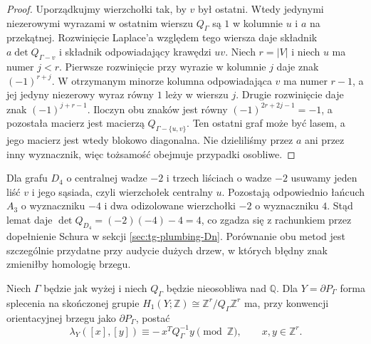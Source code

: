 \begin{proof}
Uporządkujmy wierzchołki tak, by $v$ był ostatni.
Wtedy jedynymi niezerowymi wyrazami
w ostatnim wierszu $Q_\Gamma$ są
$1$ w kolumnie $u$ i $a$ na przekątnej.
Rozwinięcie Laplace'a względem tego wiersza
daje składnik $a\det Q_{\Gamma-v}$ i składnik
odpowiadający krawędzi $uv$.
Niech $r=|V|$ i niech $u$ ma numer $j<r$.
Pierwsze rozwinięcie przy wyrazie w kolumnie $j$
daje znak $(-1)^{r+j}$. W otrzymanym minorze
kolumna odpowiadająca $v$ ma numer $r-1$,
a jej jedyny niezerowy wyraz równy $1$ leży
w wierszu $j$. Drugie rozwinięcie daje znak
$(-1)^{j+r-1}$. Iloczyn obu znaków jest równy
$(-1)^{2r+2j-1}=-1$, a pozostała macierz
jest macierzą $Q_{\Gamma-\{u,v\}}$.
Ten ostatni graf może być lasem,
a jego macierz jest wtedy blokowo diagonalna.
Nie dzieliliśmy przez $a$ ani przez inny wyznacznik,
więc tożsamość obejmuje przypadki osobliwe.
\end{proof}

\begin{przyklad}
\label{ex:tg-plumbing-D4-leaf}
Dla grafu $D_4$ o centralnej wadze $-2$
i trzech liściach o wadze $-2$
usuwamy jeden liść $v$ i jego sąsiada,
czyli wierzchołek centralny $u$.
Pozostają odpowiednio łańcuch $A_3$
o wyznaczniku $-4$ i dwa odizolowane
wierzchołki $-2$ o wyznaczniku $4$.
Stąd lemat daje
$\det Q_{D_4}=(-2)(-4)-4=4$,
co zgadza się z rachunkiem przez dopełnienie Schura
w sekcji \ref{sec:tg-plumbing-Dn}.
Porównanie obu metod jest szczególnie
przydatne przy audycie dużych drzew,
w których błędny znak zmieniłby
homologię brzegu.
\end{przyklad}

\begin{stwierdzenie}
Niech $\Gamma$ będzie jak wyżej i niech $Q_\Gamma$ będzie
nieosobliwa nad $\mathbb Q$. Dla $Y=\partial P_\Gamma$
forma splecenia na skończonej grupie
$H_1(Y;\mathbb Z)\cong\mathbb Z^r/Q_\Gamma\mathbb Z^r$
ma, przy konwencji orientacyjnej brzegu jako $\partial P_\Gamma$,
postać
\[
\lambda_Y([x],[y])\equiv-\,x^TQ_\Gamma^{-1}y
\pmod{\mathbb Z}, \qquad x,y\in\mathbb Z^r.
\]
\end{stwierdzenie}

